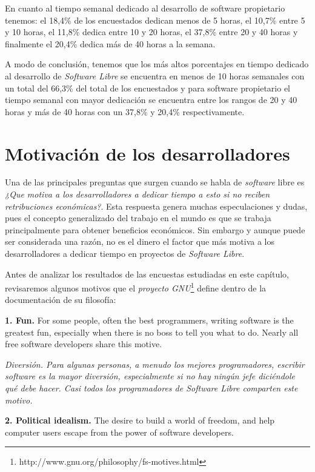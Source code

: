 En cuanto al tiempo semanal dedicado  al desarrollo de software propietario tenemos: el 18,4\% de los encuestados dedican menos de 5 horas, el 10,7\% entre 5 y 10 horas, el 11,8\% dedica entre 10 y 20 horas, el 37,8\% entre 20 y 40 horas y finalmente el 20,4\% dedica más de 40 horas a la semana.

A modo de conclusión, tenemos que los más altos  porcentajes en tiempo dedicado al desarrollo de \textit{Software Libre} se encuentra en menos de 10 horas  semanales con un total del 66,3\% del total de los encuestados y para software propietario el tiempo semanal con mayor dedicación se encuentra entre los rangos de 20 y 40 horas y más de 40 horas con un 37,8\% y 20,4\% respectivamente.

\section{Motivación de los desarrolladores}

Una de las principales preguntas que surgen cuando se habla de \textit{software} libre es \textit{¿Que motiva a los desarrolladores a dedicar tiempo a esto si no reciben retribuciones económicas?}. Esta respuesta genera muchas especulaciones y dudas, pues el concepto generalizado del trabajo en el mundo es que se trabaja principalmente para obtener beneficios económicos. Sin embargo y aunque puede ser considerada una razón, no es el dinero el factor que más motiva a los desarrolladores a dedicar tiempo en proyectos de \textit{Software Libre}.

Antes de analizar los resultados de  las encuestas estudiadas en este capítulo, revisaremos algunos motivos que el  \textit{proyecto GNU}\footnote{ http://www.gnu.org/philosophy/fs-motives.html } define dentro de la documentación de su filosofía:

{\bf 1. Fun.} For some people, often the best programmers, writing software is the greatest fun, especially when there is no boss to tell you what to do. Nearly all free software developers share this motive.

\textit{Diversión. Para algunas personas, a menudo los mejores programadores, escribir software es la mayor diversión, especialmente si no hay ningún jefe diciéndole qué debe hacer. Casi todos los programadores de \textit{Software Libre} comparten este motivo.}\vspace{0.4cm} 

{\bf 2. Political idealism.} The desire to build a world of freedom, and help computer users escape from the power of software developers.

